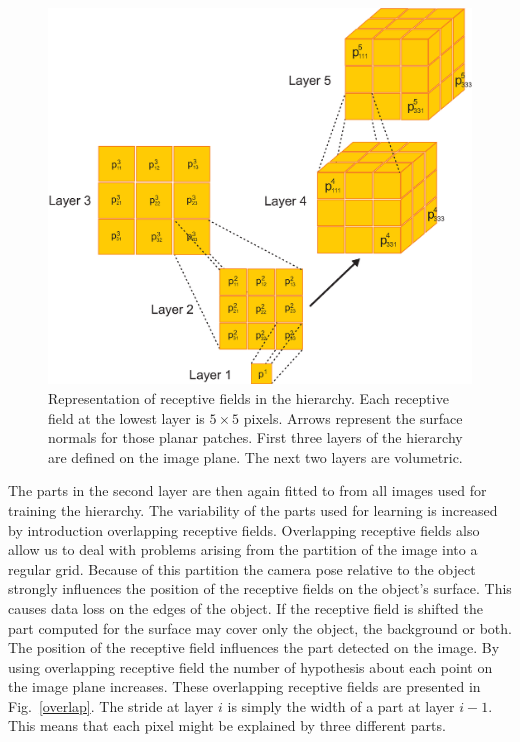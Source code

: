 \documentclass[letterpaper,10pt,conference]{ieeeconf}  %
\begin{document}
\begin{figure}[t]
 \centering
\includegraphics[width=0.9\columnwidth]{../images/hierarchy.eps}
\caption{Representation of receptive fields in the hierarchy. Each receptive field at the lowest layer is $5 \times 5$ pixels. Arrows represent the surface normals for those planar patches. First three layers of the hierarchy are defined on the image plane. The next two layers are volumetric.}
 \label{word}
\end{figure}

The parts in the second layer are then again fitted to from all images used for training the hierarchy. The variability of the parts used for learning is increased by introduction overlapping receptive fields. Overlapping receptive fields also allow us to deal with problems arising from the  partition of the image into a regular grid. Because of this partition the camera pose relative to the object strongly influences the position of the receptive fields on the object's surface. This causes data loss on the edges of the object. If the receptive field is shifted the part computed for the surface may cover only the object, the background or both. The position of the receptive field influences the part detected on the image. By using overlapping receptive field the number of hypothesis about each point on the image plane increases. These overlapping receptive fields are presented in Fig.~\ref{overlap}. The stride at layer $i$ is simply the width of a part at layer $i-1$. This means that each pixel might be explained by three different parts. 
\end{document}
